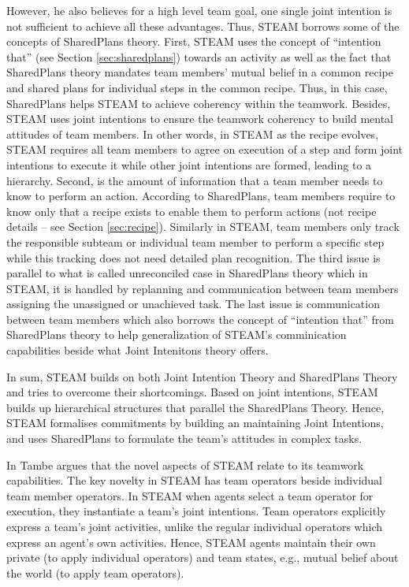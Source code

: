 \documentclass[11pt]{article}
\begin{document}
However, he also believes for a high level team goal, one single joint intention
is not sufficient to achieve all these advantages. Thus, STEAM borrows some of
the concepts of SharedPlans theory. First, STEAM uses the concept of ``intention
that'' (see Section \ref{sec:sharedplans}) towards an activity as well as the
fact that SharedPlans theory mandates team members' mutual belief in a common
recipe and shared plans for individual steps in the common recipe. Thus, in this
case, SharedPlans helps STEAM to achieve coherency within the teamwork. Besides,
STEAM uses joint intentions to ensure the teamwork coherency to build mental
attitudes of team members. In other words, in STEAM as the recipe evolves, STEAM
requires all team members to agree on execution of a step and form joint
intentions to execute it while other joint intentions are formed, leading to a
hierarchy. Second, is the amount of information that a team member needs to know
to perform an action. According to SharedPlans, team members require to know
only that a recipe exists to enable them to perform actions (not recipe details
-- see Section \ref{sec:recipe}). Similarly in STEAM, team members only track
the responsible subteam or individual team member to perform a specific step
while this tracking does not need detailed plan recognition. The third issue is
parallel to what is called unreconciled case in SharedPlans theory which in
STEAM, it is handled by replanning and communication between team members
assigning the unassigned or unachieved task. The last issue is communication
between team members which also borrows the concept of ``intention that'' from
SharedPlans theory to help generalization of STEAM's comminication capabilities
beside what Joint Intenitons theory offers.

In sum, STEAM builds on both Joint Intention Theory and SharedPlans Theory and
tries to overcome their shortcomings. Based on joint intentions, STEAM builds up
hierarchical structures that parallel the SharedPlans Theory. Hence, STEAM
formalises commitments by building an  maintaining Joint Intentions, and uses
SharedPlans to formulate the team's attitudes in complex tasks.

In \cite{tambe:flexible-teamwork} Tambe argues that the novel aspects of STEAM
relate to its teamwork capabilities. The key novelty in STEAM has team operators
beside individual team member operators. In STEAM when agents select a team
operator for execution, they instantiate a team's joint intentions. Team
operators explicitly express a team's joint activities, unlike the regular
individual operators which express an agent's own activities. Hence, STEAM
agents maintain their own private (to apply individual operators) and team
states, e.g., mutual belief about the world (to apply team operators).
\end{document}
